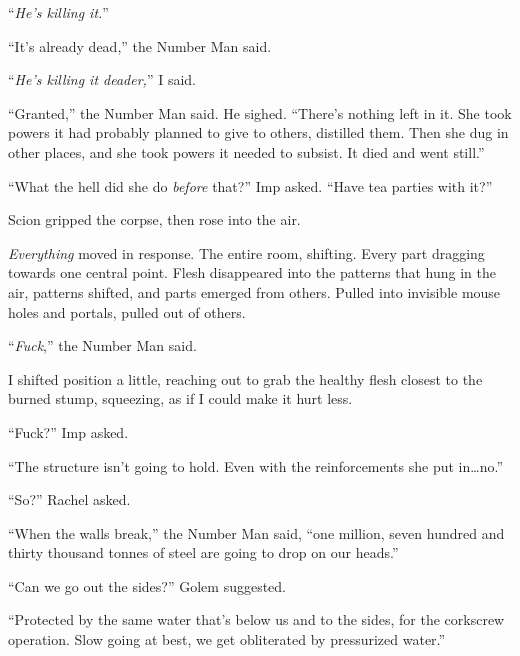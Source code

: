 ``\emph{He's killing it.}''



``It's already dead,'' the Number Man said.



``\emph{He's killing it deader,}'' I said.



``Granted,'' the Number Man said.  He sighed.  ``There's nothing left in it.  She took powers it had probably planned to give to others, distilled them.  Then she dug in other places, and she took powers it needed to subsist.  It died and went still.''



``What the hell did she do \emph{before} that?'' Imp asked.  ``Have tea parties with it?''



Scion gripped the corpse, then rose into the air.



\emph{Everything} moved in response.  The entire room, shifting.  Every part dragging towards one central point.  Flesh disappeared into the patterns that hung in the air, patterns shifted, and parts emerged from others.  Pulled into invisible mouse holes and portals, pulled out of others.



``\emph{Fuck},'' the Number Man said.



I shifted position a little, reaching out to grab the healthy flesh closest to the burned stump, squeezing, as if I could make it hurt less.



``Fuck?'' Imp asked.



``The structure isn't going to hold.  Even with the reinforcements she put in\ldots no.''



``So?'' Rachel asked.



``When the walls break,'' the Number Man said, ``one million, seven hundred and thirty thousand tonnes of steel are going to drop on our heads.''



``Can we go out the sides?''  Golem suggested.



``Protected by the same water that's below us and to the sides, for the corkscrew operation.  Slow going at best, we get obliterated by pressurized water.''



